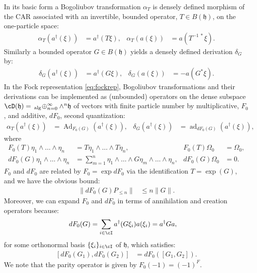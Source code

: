 \documentclass[a4paper, 11pt]{article}
\newcommand{\fh}{\mathfrak{h}}
\DeclareMathOperator{\Ad}{Ad}
\DeclareMathOperator{\ad}{ad}
\DeclareMathOperator{\1}{\mathds{1}}
\DeclareMathOperator{\alg}{alg}
\begin{document}
In its basic form a Bogoliubov transformation $\alpha_{T}$ is densely defined morphism of the CAR associated with an invertible, bounded operator, $T\in B(\fh)$, on the one-particle space:
\begin{align}
\label{eq:bogmor}
\alpha_{T}(a^{\dag}(\xi)) & = a^{\dag}(T\xi), & \alpha_{T}(a(\xi)) & = a(T^{-1\!\ *}\xi).
\end{align}
Similarly a bounded operator $G\in B(\fh)$ yields a densely defined derivation $\delta_{G}$ by:
\begin{align}
\label{eq:bogder}
\delta_{G}(a^{\dag}(\xi)) & = a^{\dag}(G\xi), & \delta_{G}(a(\xi)) & = -a(G^{*}\xi).
\end{align}
In the Fock representation \eqref{eq:fockrep}, Bogoliubov transformations and their derivations can be implemented as (unbounded) operators on the dense subspace $\cD(\fh) =\!\ _{\alg}\!\oplus_{n=0}^{\infty}\wedge^{n}\fh$ of vectors with finite particle number by multiplicative, $F_{0}$, and additive, $dF_{0}$, second quantization:
\begin{align}
\label{eq:bogmultcar}
\alpha_{T}(a^{\dag}(\xi)) & = \Ad_{F_{0}(G)}(a^{\dag}(\xi)), & \delta_{G}(a^{\dag}(\xi)) & = \ad_{dF_{0}(G)}(a^{\dag}(\xi)),
\end{align}
where
\begin{align}
\label{eq:secondquant}
F_{0}(T)\eta_{1}\wedge\dots\wedge\eta_{n} & = T\eta_{1}\wedge\dots\wedge T\eta_{n}, & F_{0}(T)\Omega_{0} & = \Omega_{0}, \\ \nonumber
dF_{0}(G)\eta_{1}\wedge\dots\wedge\eta_{n} & = \sum_{m=1}^{n}\eta_{1}\wedge\dots\wedge G\eta_{m}\wedge\dots\wedge\eta_{n}, & dF_{0}(G)\Omega_{0} & = 0.
\end{align}
$F_{0}$ and $dF_{0}$ are related by $F_{0} = \exp dF_{0}$ via the identification $T = \exp(G)$, and we have the obvious bound:
\begin{align}
\label{eq:secondquantbound}
\|dF_{0}(G)P_{\leq n}\| & \leq n \|G\|.
\end{align}
Moreover, we can expand $F_{0}$ and $dF_{0}$ in terms of annihilation and creation operators because:
\begin{align}
\label{eq:secondquantaraki}
dF_{0}(G) & = \sum_{i\in\cI}a^{\dag}(G\xi_{i})a(\xi_{i}) = a^{\dag}Ga,
\end{align}
for some orthonormal basis $\{\xi_{i}\}_{i\in\cI}$ of $\fh$, which satisfies:
\begin{align}
\label{eq:secondquantcomm}
[dF_{0}(G_{1}),dF_{0}(G_{2})] & = dF_{0}([G_{1},G_{2}]).
\end{align}
We note that the parity operator is given by $F_{0}(-1) = (-1)^{F}$. 
\end{document}
